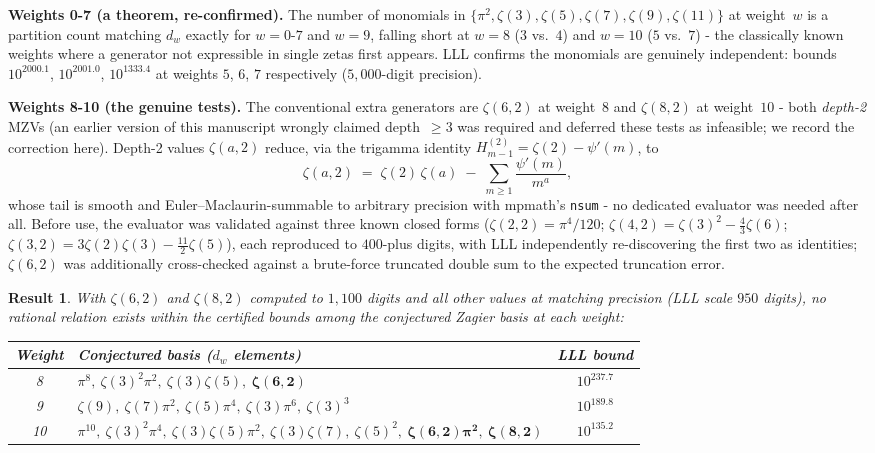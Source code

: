 \documentclass[12pt]{article}
\newtheorem{result}[theorem]{Result}
\theoremstyle{definition}
\theoremstyle{remark}
\begin{document}
\textbf{Weights 0-7 (a theorem, re-confirmed).}  The number of
monomials in $\{\pi^2,\zeta(3),\zeta(5),\zeta(7),\zeta(9),\zeta(11)\}$
at weight~$w$ is a partition count matching $d_w$ exactly for
$w=0$-$7$ and $w=9$, falling short at $w=8$ ($3$ vs.\ $4$) and
$w=10$ ($5$ vs.\ $7$) - the classically known weights where a
generator not expressible in single zetas first appears.  LLL
confirms the monomials are genuinely independent: bounds
$10^{2000.1}$, $10^{2001.0}$, $10^{1333.4}$ at weights $5$, $6$, $7$
respectively ($5{,}000$-digit precision).

\textbf{Weights 8-10 (the genuine tests).}  The conventional extra
generators are $\zeta(6,2)$ at weight~$8$ and $\zeta(8,2)$ at
weight~$10$ - both \emph{depth-2} MZVs (an earlier version of this
manuscript wrongly claimed depth~$\ge 3$ was required and deferred
these tests as infeasible; we record the correction here).  Depth-2
values $\zeta(a,2)$ reduce, via the trigamma identity
$H^{(2)}_{m-1}=\zeta(2)-\psi'(m)$, to
\[
  \zeta(a,2) \;=\; \zeta(2)\,\zeta(a)\;-\;\sum_{m\ge 1}
  \frac{\psi'(m)}{m^a},
\]
whose tail is smooth and Euler--Maclaurin-summable to arbitrary
precision with mpmath's \texttt{nsum} - no dedicated evaluator was
needed after all.  Before use, the evaluator was validated against
three known closed forms ($\zeta(2,2)=\pi^4/120$;
$\zeta(4,2)=\zeta(3)^2-\tfrac43\zeta(6)$;
$\zeta(3,2)=3\zeta(2)\zeta(3)-\tfrac{11}{2}\zeta(5)$), each reproduced
to $400$-plus digits, with LLL independently re-discovering the first
two as identities; $\zeta(6,2)$ was additionally cross-checked against
a brute-force truncated double sum to the expected truncation error.

\begin{result}\label{res:zagier}
With $\zeta(6,2)$ and $\zeta(8,2)$ computed to $1{,}100$ digits and
all other values at matching precision (LLL scale $950$ digits), no
rational relation exists within the certified bounds among the
conjectured Zagier basis at each weight:
\begin{center}
\begin{tabular}{@{}clc@{}}
\toprule
Weight & Conjectured basis ($d_w$ elements) & LLL bound \\
\midrule
8 & $\pi^8,\ \zeta(3)^2\pi^2,\ \zeta(3)\zeta(5),\ \boldsymbol{\zeta(6,2)}$ & $10^{237.7}$ \\
9 & $\zeta(9),\ \zeta(7)\pi^2,\ \zeta(5)\pi^4,\ \zeta(3)\pi^6,\ \zeta(3)^3$ & $10^{189.8}$ \\
10 & $\pi^{10},\ \zeta(3)^2\pi^4,\ \zeta(3)\zeta(5)\pi^2,\ \zeta(3)\zeta(7),\ \zeta(5)^2,\ \boldsymbol{\zeta(6,2)\pi^2},\ \boldsymbol{\zeta(8,2)}$ & $10^{135.2}$ \\
\bottomrule
\end{tabular}
\end{center}
\end{result}
\end{document}
